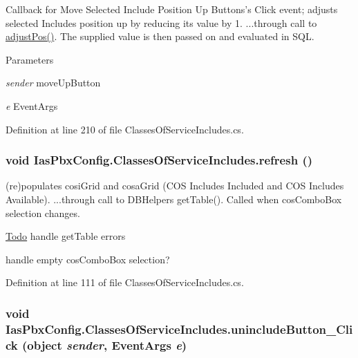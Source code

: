 Callback for Move Selected Include Position Up Buttons's Click event; adjusts selected Includes position up by reducing its value by 1. ...through call to \hyperlink{class_ias_pbx_config_1_1_classes_of_service_includes_a1a77c41288db274dbe205da6b34ccb1f}{adjustPos()}. The supplied value is then passed on and evaluated in SQL. 
\begin{DoxyParams}{Parameters}
\item[{\em sender}]moveUpButton \item[{\em e}]EventArgs \end{DoxyParams}


Definition at line 210 of file ClassesOfServiceIncludes.cs.\hypertarget{class_ias_pbx_config_1_1_classes_of_service_includes_a67961a306356b33f1533714abb1008e1}{
\subsubsection[{refresh}]{\setlength{\rightskip}{0pt plus 5cm}void IasPbxConfig.ClassesOfServiceIncludes.refresh ()}}
\label{class_ias_pbx_config_1_1_classes_of_service_includes_a67961a306356b33f1533714abb1008e1}


(re)populates cosiGrid and cosaGrid (COS Includes Included and COS Includes Available). ...through call to DBHelpers getTable(). Called when cosComboBox selection changes. \begin{Desc}
\item[\hyperlink{todo__todo000008}{Todo}]handle getTable errors 

handle empty cosComboBox selection? \end{Desc}


Definition at line 111 of file ClassesOfServiceIncludes.cs.\hypertarget{class_ias_pbx_config_1_1_classes_of_service_includes_ad40df8ec47f50d714bf251013124f78e}{
\subsubsection[{unincludeButton\_\-Click}]{\setlength{\rightskip}{0pt plus 5cm}void IasPbxConfig.ClassesOfServiceIncludes.unincludeButton\_\-Click (object {\em sender}, \/  EventArgs {\em e})}}
\label{class_ias_pbx_config_1_1_classes_of_service_includes_ad40df8ec47f50d714bf251013124f78e}


